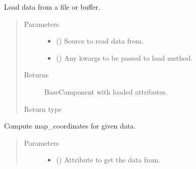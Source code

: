 \documentclass[letterpaper,10pt,english]{sphinxmanual}
\begin{document}
\begin{fulllineitems}
\begin{fulllineitems}
\label{\detokenize{api/rock:geology.src.Rock.load}}
Load data from a file or buffer.
\begin{quote}\begin{description}
\item[{Parameters}] \leavevmode\begin{itemize}
\item {} 
 () \textendash{} Source to read data from.

\item {} 
 (\sphinxstyleliteralemphasis{\sphinxupquote{, }}) \textendash{} Any kwargs to be passed to load method.

\end{itemize}

\item[{Returns}] \leavevmode
{} \textendash{} BaseComponent with loaded attributes.

\item[{Return type}] \leavevmode
{\hyperref[\detokenize{api/base_classes:geology.src.base_component.BaseComponent}]{}}

\end{description}\end{quote}

\end{fulllineitems}


\begin{fulllineitems}
\label{\detokenize{api/rock:geology.src.Rock.map_coordinates}}
Compute map\_coordinates for given data.
\begin{quote}\begin{description}
\item[{Parameters}] \leavevmode\begin{itemize}
\item {} 
 (\sphinxstyleliteralemphasis{\sphinxupquote{, }}) \textendash{} Attribute to get the data from.


\end{itemize}
\end{description}
\end{quote}
\end{fulllineitems}
\end{fulllineitems}
\end{document}
